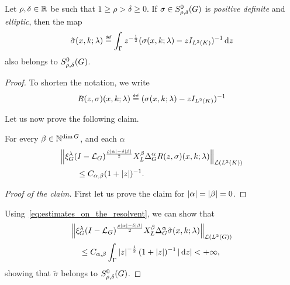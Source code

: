 \begin{lemma}
\label{lemma:inverse_of_square_root_of_a_symbol_of_order_zero}
    Let $\rho, \delta \in \mathbb{R}$ be such that $1 \geq \rho > \delta \geq 0$.
    If $\sigma \in S^{0}_{\rho, \delta}(G)$ is \emph{positive definite} and \emph{elliptic},
    then the map
    \begin{align*}
        \tilde \sigma(x, k; \lambda)
        \defeq \int_{\Gamma} z^{-\frac 1 2} (\sigma(x, k; \lambda) - z \Id {\Lebesgue 2 \CompactGroup})^{-1} \dd z
    \end{align*}
    also belongs to $S^{0}_{\rho, \delta}(G)$.
\end{lemma}
\begin{proof}
    To shorten the notation,
    we write
    \begin{align*}
        R(z, \sigma)(x, k; \lambda) \defeq (\sigma(x, k; \lambda) - z \Id {\Lebesgue 2 \CompactGroup})^{-1}
    \end{align*}

    Let us now prove the following claim.

    \begin{claim}
        For every $\beta \in \mathbb{N}^{\dim G}$, and each $\alpha$
        \begin{align}
            &\norm [\Lin {\Lebesgue 2 \CompactGroup}] {\Rep \lambda \BesselPotential {\rho \abs \alpha - \delta \abs \beta} \LeftDifferentialOperator \beta \DifferenceOperatorOrder \alpha R(z, \sigma)(x, k; \lambda)} \notag\\
            &\qquad \leq C_{\alpha, \beta} (1 + \abs z)^{-1}.
            \label{eq:estimates_on_the_resolvent}
        \end{align}
    \end{claim}
    \begin{proof}[Proof of the claim]
        First let us prove the claim for $\left|{\alpha}\right| = \left|{\beta}\right| = 0$.
    \end{proof}

    Using~\eqref{eq:estimates_on_the_resolvent},
    we can show that
    \begin{align*}
        &\norm [\Lin {\Lebesgue 2 \Group}] {\Rep \lambda \BesselPotential {\rho \abs \alpha - \delta \abs \beta} \LeftDifferentialOperator \beta \DifferenceOperatorOrder \alpha \tilde \sigma(x, k; \lambda)}\\
        &\quad \leq C_{\alpha, \beta} \int_\Gamma \abs z^{-\frac 1 2} (1 + \abs z)^{-1} \abs{\dd z} < +\infty,
    \end{align*}
    showing that $\tilde \sigma$ belongs to $S^{0}_{\rho, \delta}(G)$.
\end{proof}

